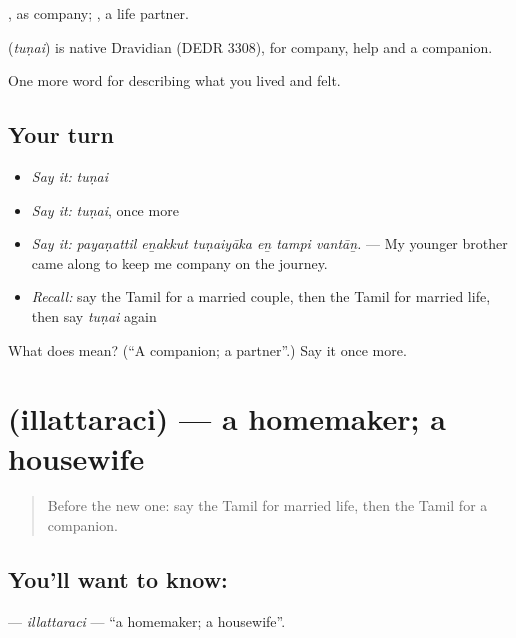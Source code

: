 , as company;  , a life partner.

\begin{cousinweb}
\textbf{} (\emph{tuṇai}) is native Dravidian (DEDR 3308), for company, help and a companion.
\end{cousinweb}

\begin{grammarlens}[title={What you've built}]
One more word for describing what you lived and felt.
\end{grammarlens}

\subsection*{Your turn}
\begin{itemize}
\raggedright
  \item \emph{Say it:} \emph{tuṇai}
  \item \emph{Say it:} \emph{tuṇai}, once more
  \item \emph{Say it:} \emph{payaṇattil eṉakkut tuṇaiyāka eṉ tampi vantāṉ.} — My younger brother came along to keep me company on the journey.
  \item \emph{Recall:} say the Tamil for a married couple, then the Tamil for married life, then say \emph{tuṇai} again
\end{itemize}

\begin{tcolorbox}[breakable,colback=teal!4,colframe=teal!35!black,title={Before you move on}]
What does  mean? (\textquotedblleft{}A companion; a partner\textquotedblright{}.) Say it once more.
\end{tcolorbox}
\section[\texorpdfstring{\ta{இல்லத்தரசி} (illattaraci)}{இல்லத்தரசி (illattaraci)}]{ (illattaraci) — a homemaker; a housewife}

\label{lesson:TA-C500-illattaraci}



\begin{quote}
Before the new one: say the Tamil for married life, then the Tamil for a companion.
\end{quote}

\subsection*{You'll want to know: }
\textbf{} — \emph{illattaraci} — \textquotedblleft{}a homemaker; a housewife\textquotedblright{}.

